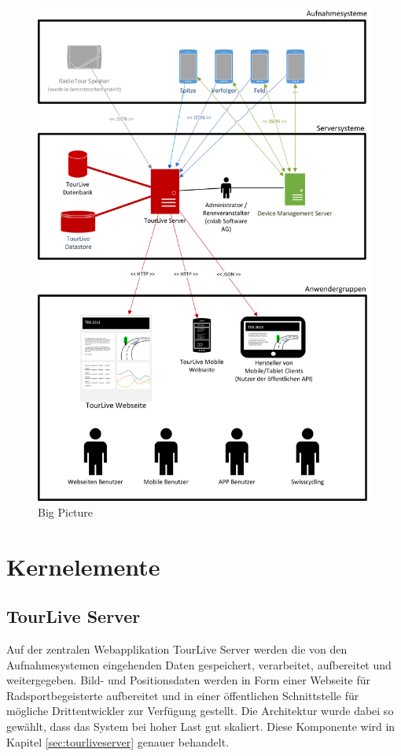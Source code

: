 \begin{figure}[H]
	\centering
	\includegraphics[width=140mm]{images/BigPicture.png}
	\caption{Big Picture}
	\label{fig:bigpicture}
\end{figure}

\pagebreak

\section{Kernelemente}
\subsection{TourLive Server}
Auf der zentralen Webapplikation TourLive Server werden die von den Aufnahmesystemen eingehenden Daten gespeichert, verarbeitet, aufbereitet und weitergegeben. Bild- und Positionsdaten werden in Form einer Webseite für Radsportbegeisterte aufbereitet und in einer öffentlichen Schnittstelle für mögliche Drittentwickler zur Verfügung gestellt. Die Architektur wurde dabei so gewählt, dass das System bei hoher Last gut skaliert. Diese Komponente wird in Kapitel \ref{sec:tourliveserver} genauer behandelt.


